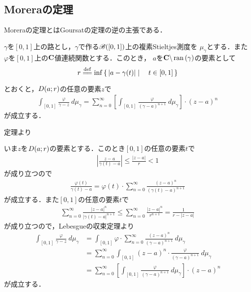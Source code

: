 \subsection{Moreraの定理}
	Moreraの定理とはGoursatの定理の逆の主張である．
	
	\begin{screen}
		\begin{thm}[正則ならば級数展開可能]
			$\gamma$を$[0,1]$上の路とし，$\gamma$で作る$\mathscr{B}([0,1])$上の複素Stieltjes測度を
			$\mu_{\gamma}$とする．また$\varphi$を$[0,1]$上の$\mathbf{C}$値連続関数とする．このとき，
			$a$を$\mathbf{C} \backslash \operatorname*{ran} \left(\gamma\right)$の要素として
			\begin{align}
				r \defeq \inf{}{\Set{|a-\gamma(t)|}{t \in [0,1]}}
			\end{align}
			とおくと，$D(a;r)$の任意の要素$z$で
			\begin{align}
				\int_{[0,1]} \frac{\varphi}{\gamma - z}\ d\mu_{\gamma}
				= \sum_{n=0}^{\infty} \left[ \int_{[0,1]} \frac{\varphi}{(\gamma - a)^{n+1}}\ d\mu_{\gamma} \right] \cdot (z-a)^{n}
			\end{align}
			が成立する．
		\end{thm}
	\end{screen}
	
	定理より
	
	\begin{sketch}
		いま$z$を$D(a;r)$の要素とする．このとき$[0,1]$の任意の要素$t$で
		\begin{align}
			\left|\frac{z-a}{\gamma(t) - a}\right|
			\leq \frac{|z-a|}{r}
			< 1
		\end{align}
		が成り立つので
		\begin{align}
			\frac{\varphi(t)}{\gamma(t) - a} = \varphi(t) \cdot \sum_{n=0}^{\infty} \frac{(z-a)^{n}}{(\gamma(t) - a)^{n+1}}
		\end{align}
		が成立する．また$[0,1]$の任意の要素$t$で
		\begin{align}
			\sum_{n=0}^{\infty} \frac{|z-a|^{n}}{|\gamma(t) - a|^{n+1}}
			\leq \sum_{n=0}^{\infty} \frac{|z-a|^{n}}{r^{n+1}}
			= \frac{1}{r - |z-a|}
		\end{align}
		が成り立つので，Lebesgueの収束定理より
		\begin{align}
			\int_{[0,1]} \frac{\varphi}{\gamma - z}\ d\mu_{\gamma}
			&= \int_{[0,1]} \varphi \cdot \sum_{n=0}^{\infty} \frac{(z-a)^{n}}{(\gamma - a)^{n+1}}\ d\mu_{\gamma} \\
			&= \sum_{n=0}^{\infty} \int_{[0,1]} (z-a)^{n} \cdot \frac{\varphi}{(\gamma - a)^{n+1}}\ d\mu_{\gamma} \\
			&= \sum_{n=0}^{\infty} \left[ \int_{[0,1]} \frac{\varphi}{(\gamma - a)^{n+1}}\ d\mu_{\gamma} \right] \cdot (z-a)^{n}
		\end{align}
		が成立する．
		\QED
	\end{sketch}
	
	\begin{screen}
		\begin{thm}[正則関数の導関数も正則]
			
		\end{thm}
	\end{screen}
	
	\begin{screen}
		\begin{thm}[Moreraの定理]
			
		\end{thm}
	\end{screen}